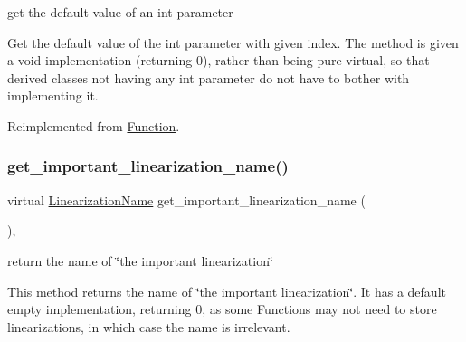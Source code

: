 get the default value of an int parameter 

Get the default value of the int parameter with given index. The method is given a void implementation (returning 0), rather than being pure virtual, so that derived classes not having any int parameter do not have to bother with implementing it. 

Reimplemented from \mbox{\hyperlink{class_s_m_spp__di__unipi__it_1_1_function_a75dd1491b74c4b9476755e061dce3e04}{Function}}.

\mbox{\label{class_s_m_spp__di__unipi__it_1_1_c05_function_abb9e7e2895542986ff7748e38d0dd2e5}} 
\subsubsection{\texorpdfstring{get\+\_\+important\+\_\+linearization\+\_\+name()}{get\_important\_linearization\_name()}}
{\footnotesize\ttfamily virtual \mbox{\hyperlink{class_s_m_spp__di__unipi__it_1_1_c05_function_ae90bf93c6d4b4ada66791c735d1c03cc}{Linearization\+Name}} get\+\_\+important\+\_\+linearization\+\_\+name (\begin{DoxyParamCaption}\item[{void}]{ }\end{DoxyParamCaption})\hspace{0.3cm}{\ttfamily [inline]}, {\ttfamily [virtual]}}



return the name of \char`\"{}the important linearization\char`\"{} 

This method returns the name of \char`\"{}the important linearization\char`\"{}. It has a default empty implementation, returning 0, as some Functions may not need to store linearizations, in which case the name is irrelevant. \mbox{\label{class_s_m_spp__di__unipi__it_1_1_c05_function_a6fa70047dc8b3d43a3ed44f1859a7239}} 
